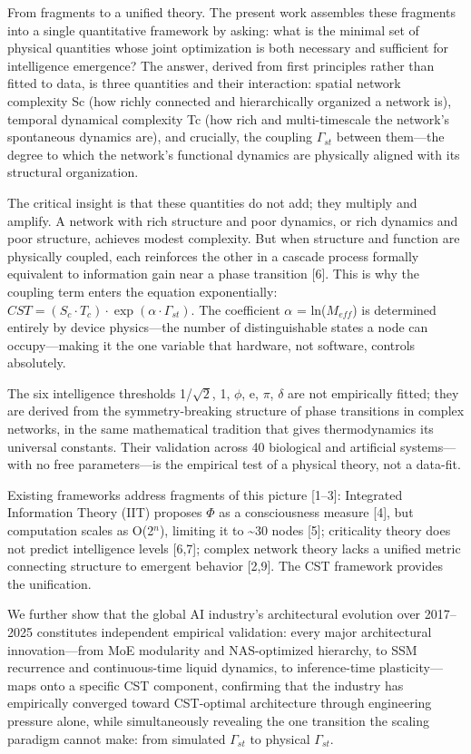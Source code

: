 \documentclass[a4paper,12pt]{article}
\begin{document}
From fragments to a unified theory. The present work assembles these fragments into a single quantitative framework by asking: what is the minimal set of physical quantities whose joint optimization is both necessary and sufficient for intelligence emergence? The answer, derived from first principles rather than fitted to data, is three quantities and their interaction: spatial network complexity Sc (how richly connected and hierarchically organized a network is), temporal dynamical complexity Tc (how rich and multi-timescale the network's spontaneous dynamics are), and crucially, the coupling $\Gamma_{st}$ between them---the degree to which the network's functional dynamics are physically aligned with its structural organization.


The critical insight is that these quantities do not add; they multiply and amplify. A network with rich structure and poor dynamics, or rich dynamics and poor structure, achieves modest complexity. But when structure and function are physically coupled, each reinforces the other in a cascade process formally equivalent to information gain near a phase transition [6]. This is why the coupling term enters the equation exponentially: $CST = (S_c \cdot T_c) \cdot \exp(\alpha \cdot \Gamma_{st})$. The coefficient $\alpha$ = ln($M_{eff}$) is determined entirely by device physics---the number of distinguishable states a node can occupy---making it the one variable that hardware, not software, controls absolutely.


The six intelligence thresholds {1/$\sqrt{2}$, 1, $\phi$, e, $\pi$, $\delta$} are not empirically fitted; they are derived from the symmetry-breaking structure of phase transitions in complex networks, in the same mathematical tradition that gives thermodynamics its universal constants. Their validation across 40 biological and artificial systems---with no free parameters---is the empirical test of a physical theory, not a data-fit.


Existing frameworks address fragments of this picture [1--3]: Integrated Information Theory (IIT) proposes $\Phi$ as a consciousness measure [4], but computation scales as O(2$^n$), limiting it to \textasciitilde{}30 nodes [5]; criticality theory does not predict intelligence levels [6,7]; complex network theory lacks a unified metric connecting structure to emergent behavior [2,9]. The CST framework provides the unification.


We further show that the global AI industry's architectural evolution over 2017--2025 constitutes independent empirical validation: every major architectural innovation---from MoE modularity and NAS-optimized hierarchy, to SSM recurrence and continuous-time liquid dynamics, to inference-time plasticity---maps onto a specific CST component, confirming that the industry has empirically converged toward CST-optimal architecture through engineering pressure alone, while simultaneously revealing the one transition the scaling paradigm cannot make: from simulated $\Gamma_{st}$ to physical $\Gamma_{st}$.
\end{document}
